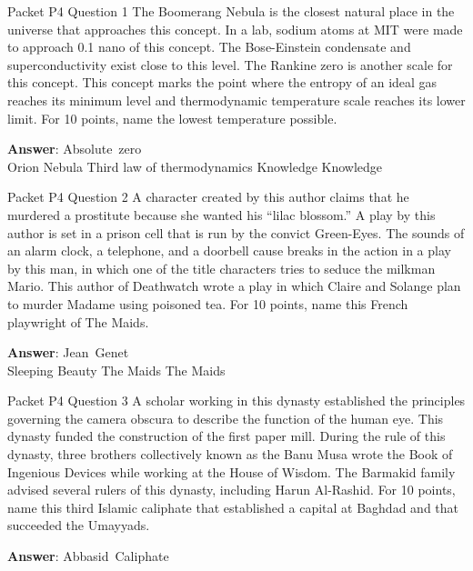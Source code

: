 \begin{frame}{Packet P4 Question 1}
The Boomerang Nebula is   the closest natural place in the universe that approaches this concept. In a lab, sodium atoms at MIT were made to approach 0.1 nano of this concept. The Bose-Einstein condensate and superconductivity exist close to this   level. The Rankine zero is another scale for this concept. This concept marks the point where the entropy of an ideal gas reaches its minimum level and thermodynamic temperature scale reaches its lower limit. For 10 points, name the lowest temperature possible.      

\textbf{Answer}: Absolute\ zero\\
 Orion Nebula
 Third law of thermodynamics
 Knowledge
 Knowledge
\end{frame}

\begin{frame}{Packet P4 Question 2}
A character created by this author claims that he murdered a prostitute because she wanted his “lilac   blossom.” A play by this author is set in a prison cell that is run by the convict Green-Eyes. The sounds   of an alarm clock, a telephone, and a doorbell cause breaks in the action in a play by this man, in which one of the title characters tries to seduce the milkman Mario. This     author of Deathwatch wrote a play in which   Claire and Solange plan to murder Madame using poisoned tea.   For 10 points, name this French playwright of The Maids.

\textbf{Answer}: Jean\ Genet\\
 Sleeping Beauty
 The Maids
 The Maids
\end{frame}

\begin{frame}{Packet P4 Question 3}
A scholar working in this dynasty established the principles governing the camera obscura to describe the function of the human eye. This dynasty funded the construction of the first paper mill. During the rule of this dynasty, three brothers collectively known as the Banu Musa wrote the Book of Ingenious Devices while working at the House of Wisdom. The Barmakid family advised several   rulers of this dynasty, including Harun Al-Rashid. For     10 points, name this third Islamic caliphate that established   a capital at Baghdad and that succeeded the Umayyads.

\textbf{Answer}: Abbasid\ Caliphate\\
\end{frame}

